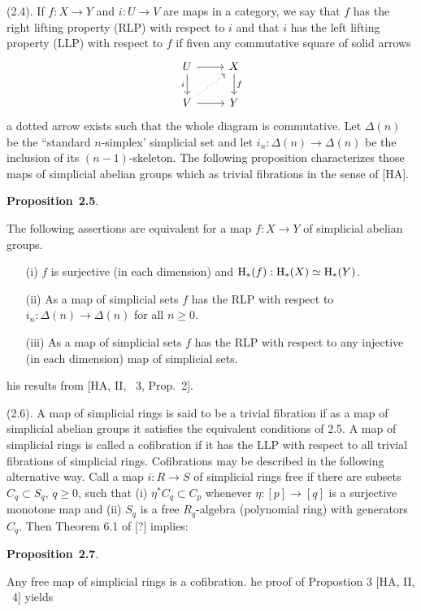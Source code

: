 \documentclass[10pt,reqno]{amsart}
\newenvironment{prop}[1]{
\par\medskip\noindent\textbf{Proposition}~\textbf{#1}.\,\itshape
}
\renewcommand{\H}{\mathrm{H}}
\begin{document}
(2.4). If $f:X\to Y$ and $i:U\to V$ are maps in a category, we say that $f$ has the
right lifting property (RLP) with respect to $i$ and that $i$ has the left lifting
property (LLP) with respect to $f$ if fiven any commutative square of solid arrows
\[
  \begin{tikzcd}
    U\ar[r]\ar[d,"i"'] & X\ar[d,"f"]\\
    V\ar[r]\ar[ur,dotted] & Y
  \end{tikzcd}
\]
a dotted arrow exists such that the whole diagram is commutative. Let $\Delta(n)$ be the
``standard $n$-simplex' simplicial set and let $i_n:\Delta(n)\to\Delta(n)$ be the
inclusion of its $(n-1)$-skeleton. The following proposition characterizes those maps
of simplicial abelian groups which as trivial fibrations in the sense of [HA].

\begin{prop}{2.5}
The following assertions are equivalent for a map $f:X\to Y$ of simplicial abelian
groups.
\begin{itemize}
  \item[(i)] $f$ is surjective (in each dimension) and $\H_\ast(f):\H_\ast(X)\simeq\H_\ast(Y)$.
  \item[(ii)] As a map of simplicial sets $f$ has the RLP with respect to
        $i_n:\Delta(n)\to\Delta(n)$ for all $n\geq 0$.
  \item[(iii)] As a map of simplicial sets $f$ has the RLP with respect to any injective
        (in each dimension) map of simplicial sets.
\end{itemize}
\end{prop}
This results from [HA, II, \textsection~3, Prop.~2].

(2.6). A map of simplicial rings is said to be a trivial fibration if as a map of
simplicial abelian groups it satisfies the equivalent conditions of 2.5. A map of
simplicial rings is called a cofibration if it has the LLP with respect to all trivial
fibrations of simplicial rings. Cofibrations may be described in the following
alternative way. Call a map $i:R\to S$ of simplicial rings free if there are subsets
$C_q\subset S_q$, $q\geq 0$, such that (i) $\eta^\ast C_q\subset C_p$ whenever
$\eta:[p]\to[q]$ is a surjective monotone map and (ii) $S_q$ is a free $R_q$-algebra
(polynomial ring) with generators $C_q$. Then Theorem 6.1 of [?] implies:

\begin{prop}{2.7}
Any free map of simplicial rings is a cofibration.
\end{prop}
The proof of Propostion 3 [HA, II, \textsection~4] yields
\end{document}
